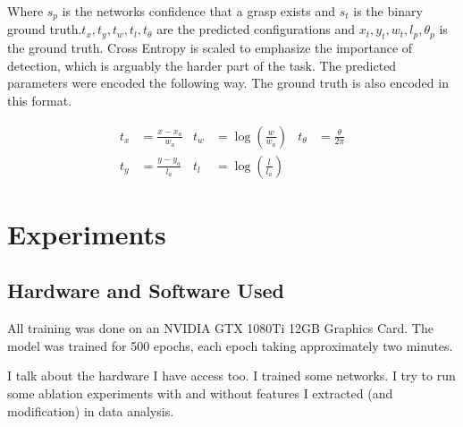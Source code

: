 \documentclass{article}
\begin{document}
Where $s_p$ is the networks confidence that a grasp exists and $s_t$ is the binary ground
truth.$t_x, t_y, t_w, t_l, t_\theta$ are the predicted configurations and
$x_t, y_t, w_t, l_p, \theta_p$ is the ground truth. Cross Entropy is scaled to
emphasize the importance of detection, which is arguably the harder part of the task. The
predicted parameters were encoded the following way. The ground truth is also encoded in
this format.

\begin{align*}
t_x&=\frac{x-x_a}{w_a} & t_w&=\log(\frac{w}{w_a}) & t_\theta&=\frac{\theta}{2\pi}\\
t_y&=\frac{y-y_a}{l_a} & t_l&=\log(\frac{l}{l_a}) & &
\end{align*}

\section{Experiments}

\subsection{Hardware and Software Used}
All training was done on an NVIDIA GTX 1080Ti 12GB Graphics Card. The model was
trained for 500 epochs, each epoch taking approximately two minutes.

I talk about the hardware I have access too. I trained some networks. I try
to run some ablation experiments with and without features I extracted (and
modification) in data analysis.
\end{document}
